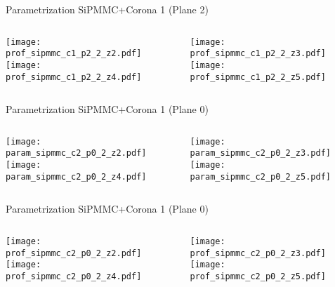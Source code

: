 \documentclass{beamer}
\begin{document}
\begin{frame}{Parametrization SiPMMC+Corona 1 (Plane 2)}
	\begin{columns}[onlytextwidth]
		\begin{column}{0.5\textwidth}
			\texttt{[image: prof\_sipmmc\_c1\_p2\_2\_z2.pdf]} \\
			\texttt{[image: prof\_sipmmc\_c1\_p2\_2\_z4.pdf]}
		 \end{column}
		 \begin{column}{0.5\textwidth}
			\texttt{[image: prof\_sipmmc\_c1\_p2\_2\_z3.pdf]} \\
			\texttt{[image: prof\_sipmmc\_c1\_p2\_2\_z5.pdf]}
		 \end{column}
 \end{columns}
\end{frame}

\begin{frame}{Parametrization SiPMMC+Corona 1 (Plane 0)}
	\begin{columns}[onlytextwidth]
		\begin{column}{0.5\textwidth}
			\texttt{[image: param\_sipmmc\_c2\_p0\_2\_z2.pdf]} \\
			\texttt{[image: param\_sipmmc\_c2\_p0\_2\_z4.pdf]}
		 \end{column}
		 \begin{column}{0.5\textwidth}
			\texttt{[image: param\_sipmmc\_c2\_p0\_2\_z3.pdf]} \\
			\texttt{[image: param\_sipmmc\_c2\_p0\_2\_z5.pdf]}
		 \end{column}
 \end{columns}
\end{frame}

\begin{frame}{Parametrization SiPMMC+Corona 1 (Plane 0)}
	\begin{columns}[onlytextwidth]
		\begin{column}{0.5\textwidth}
			\texttt{[image: prof\_sipmmc\_c2\_p0\_2\_z2.pdf]} \\
			\texttt{[image: prof\_sipmmc\_c2\_p0\_2\_z4.pdf]}
		 \end{column}
		 \begin{column}{0.5\textwidth}
			\texttt{[image: prof\_sipmmc\_c2\_p0\_2\_z3.pdf]} \\
			\texttt{[image: prof\_sipmmc\_c2\_p0\_2\_z5.pdf]}
		 \end{column}
 \end{columns}
\end{frame}
\end{document}
